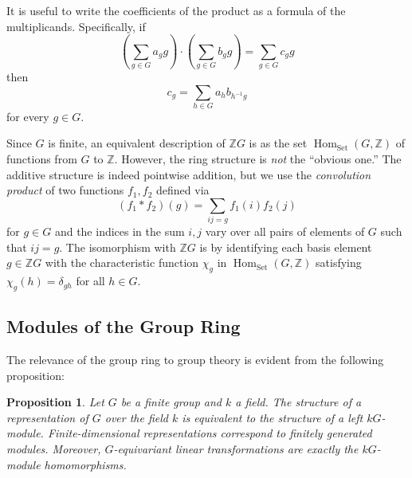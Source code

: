 \documentclass[12pt]{article}
\theoremstyle{plain}
\newtheorem{proposition}[theorem]{Proposition}
\theoremstyle{definition}
\theoremstyle{remark}
\numberwithin{equation}{section}
\begin{document}
It is useful to write the coefficients of the product as a formula of
the multiplicands.  Specifically, if
\[
\left( \sum_{g \in G} a_g g \right) \cdot
\left( \sum_{g \in G} b_g g \right)
= \sum_{g \in G} c_g g
\]
then
\[
c_g = \sum_{h \in G} a_hb_{h^{-1}g}
\]
for every $g \in G$.

Since $G$ is finite, an equivalent description of $\mathbb{Z}G$ is as the set
$\operatorname{Hom}_{\mathrm{Set}}(G,\mathbb{Z})$
of functions from $G$ to $\mathbb{Z}$.
However, the ring structure is \emph{not} the ``obvious one.''
The additive structure is indeed pointwise addition,
but we use the \emph{convolution product}
of two functions $f_1,f_2$ defined via
\[
(f_1 \ast f_2)(g) = \sum_{ij=g} f_1(i)f_2(j)
\]
for $g \in G$ and the indices in the sum $i,j$
vary over all pairs of elements of $G$ such that $ij=g$.
The isomorphism with $\mathbb{Z}G$ is by identifying each basis element
$g \in \mathbb{Z}G$ with the characteristic function $\chi_g$
in $\operatorname{Hom}_{\mathrm{Set}}(G,\mathbb{Z})$
satisfying $\chi_g(h) = \delta_{gh}$ for all $h \in G$.

\subsection{Modules of the Group Ring}

The relevance of the group ring to group theory is evident from the
following proposition:

\begin{proposition} \label{prop:equivalence}
Let $G$ be a finite group and $k$ a field.
The structure of a representation of $G$ over the field $k$
is equivalent to the structure of a left $kG$-module.
Finite-dimensional representations correspond to
finitely generated modules.
Moreover, $G$-equivariant linear transformations are
exactly the $kG$-module homomorphisms.
\end{proposition}
\end{document}
